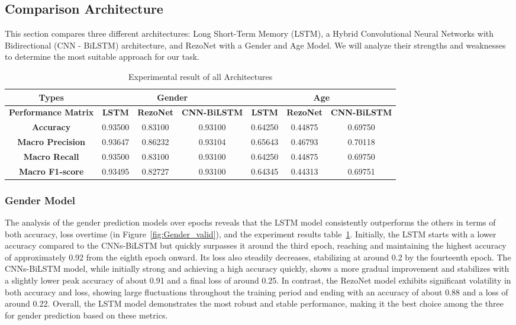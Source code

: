 \documentclass[conference, 10pt,onecolumn]{IEEEtran}
\begin{document}
\subsection{Comparison Architecture}

This section compares three different architectures: Long Short-Term Memory (LSTM), a Hybrid Convolutional Neural Networks with Bidirectional (CNN - BiLSTM) architecture, and RezoNet with a Gender and Age Model. We will analyze their strengths and weaknesses to determine the most suitable approach for our task.

\begin{table}[]
    \centering
    \begin{tabular}{|c|c|c|c|c|c|c|} \hline 
        \textbf{Types} &  \multicolumn{3}{|c|}{\textbf{Gender}}&  \multicolumn{3}{|c|}{\textbf{Age}}\\ \hline
        \textbf{Performance Matrix} & \textbf{LSTM} & \textbf{RezoNet} & \textbf{CNN-BiLSTM} & \textbf{LSTM}& \textbf{RezoNet} & \textbf{CNN-BiLSTM}\\ \hline 
        \textbf{Accuracy} & 0.93500& 0.83100 & 0.93100& 0.64250& 0.44875& 0.69750\\
        \textbf{Macro Precision}& 0.93647& 0.86232& 0.93104& 0.65643& 0.46793& 0.70118\\
        \textbf{Macro Recall}& 0.93500& 0.83100& 0.93100& 0.64250& 0.44875& 0.69750\\
        \textbf{Macro F1-score}& 0.93495& 0.82727& 0.93100& 0.64345& 0.44313& 0.69751\\ \hline
    \end{tabular}
    \caption{Experimental result of all Architectures}
    \label{tab:Experimental result of all Architectures}
\end{table}
\subsubsection{Gender Model}

The analysis of the gender prediction models over epochs reveals that the LSTM model consistently outperforms the others in terms of both accuracy, loss overtime (in Figure~\ref{fig:Gender_valid}), and the experiment results table~\ref{tab:Experimental result of all Architectures}. Initially, the LSTM starts with a lower accuracy compared to the CNNs-BiLSTM but quickly surpasses it around the third epoch, reaching and maintaining the highest accuracy of approximately 0.92 from the eighth epoch onward. Its loss also steadily decreases, stabilizing at around 0.2 by the fourteenth epoch. The CNNs-BiLSTM model, while initially strong and achieving a high accuracy quickly, shows a more gradual improvement and stabilizes with a slightly lower peak accuracy of about 0.91 and a final loss of around 0.25. In contrast, the RezoNet model exhibits significant volatility in both accuracy and loss, showing large fluctuations throughout the training period and ending with an accuracy of about 0.88 and a loss of around 0.22. Overall, the LSTM model demonstrates the most robust and stable performance, making it the best choice among the three for gender prediction based on these metrics.
\end{document}
